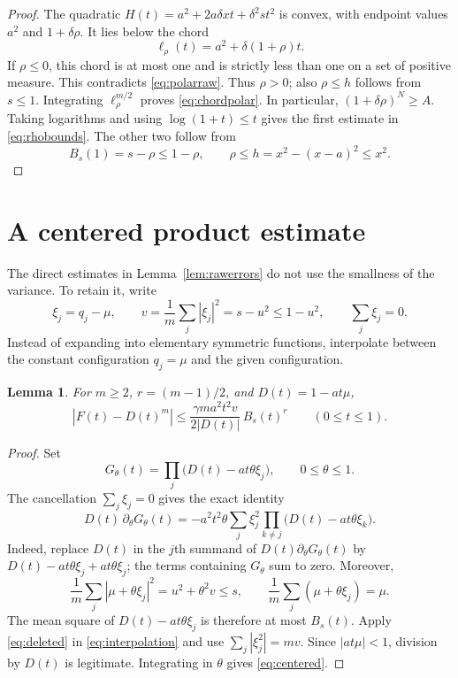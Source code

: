 \documentclass[11pt,letterpaper,reqno]{amsart}
\newtheorem{lem}[thm]{Lemma}
\theoremstyle{definition}
\numberwithin{equation}{section}
\begin{document}
\begin{proof}
The quadratic $H(t)=a^2+2a\delta xt+\delta^2st^2$ is convex, with endpoint values $a^2$ and $1+\delta\rho$. It lies below the chord
\[
 \ell_\rho(t)=a^2+\delta(1+\rho)t.
\]
If $\rho\le0$, this chord is at most one and is strictly less than one on a set of positive measure. This contradicts \eqref{eq:polarraw}. Thus $\rho>0$; also $\rho\le h$ follows from $s\le1$. Integrating $\ell_\rho^{m/2}$ proves \eqref{eq:chordpolar}. In particular, $(1+\delta\rho)^N\ge A$. Taking logarithms and using $\log(1+t)\le t$ gives the first estimate in \eqref{eq:rhobounds}. The other two follow from
\[
 B_s(1)=s-\rho\le1-\rho,\qquad
 \rho\le h=x^2-(x-a)^2\le x^2.
\]
\end{proof}

\section{A centered product estimate}\label{sec:centered}

The direct estimates in Lemma~\ref{lem:rawerrors} do not use the smallness of the variance. To retain it, write
\[
 \xi_j=q_j-\mu,\qquad
 v=\frac1m\sum_j|\xi_j|^2=s-u^2\le1-u^2,
 \qquad \sum_j\xi_j=0.
\]
Instead of expanding into elementary symmetric functions, interpolate between the constant configuration $q_j=\mu$ and the given configuration.

\begin{lem}\label{lem:centered}
For $m\ge2$, $r=(m-1)/2$, and $D(t)=1-at\mu$,
\begin{equation}\label{eq:centered}
 |F(t)-D(t)^m|
 \le\frac{\gamma ma^2t^2v}{2|D(t)|}\,B_s(t)^r
 \qquad(0\le t\le1).
\end{equation}
\end{lem}

\begin{proof}
Set
\[
 G_\theta(t)=\prod_j\bigl(D(t)-at\theta\xi_j\bigr),
 \qquad 0\le\theta\le1.
\]
The cancellation $\sum_j\xi_j=0$ gives the exact identity
\begin{equation}\label{eq:interpolation}
 D(t)\,\partial_\theta G_\theta(t)
 =-a^2t^2\theta\sum_j\xi_j^2
          \prod_{k\ne j}\bigl(D(t)-at\theta\xi_k\bigr).
\end{equation}
Indeed, replace $D(t)$ in the $j$th summand of $D(t)\partial_\theta G_\theta(t)$ by
$D(t)-at\theta\xi_j+at\theta\xi_j$; the terms containing $G_\theta$ sum to zero.
Moreover,
\[
 \frac1m\sum_j|\mu+\theta\xi_j|^2=u^2+\theta^2v\le s,
 \qquad \frac1m\sum_j(\mu+\theta\xi_j)=\mu.
\]
The mean square of $D(t)-at\theta\xi_j$ is therefore at most $B_s(t)$. Apply \eqref{eq:deleted} in \eqref{eq:interpolation} and use $\sum_j|\xi_j^2|=mv$. Since $|at\mu|<1$, division by $D(t)$ is legitimate. Integrating in $\theta$ gives \eqref{eq:centered}.
\end{proof}
\end{document}
